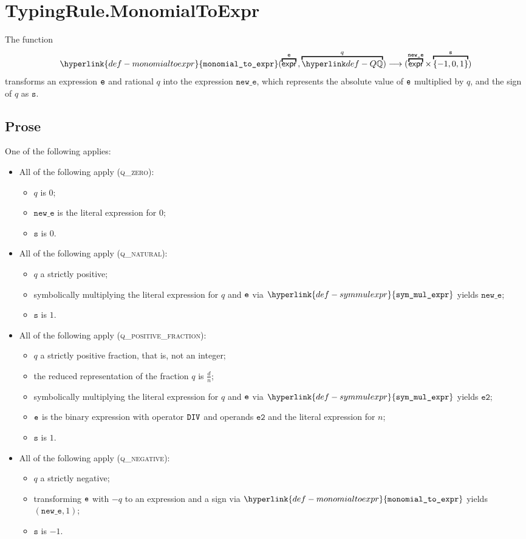 \documentclass{book}
\newcommand\monomialtoexpr[0]{\hyperlink{def-monomialtoexpr}{\texttt{monomial\_to\_expr}}}
\newcommand\symmulexpr[0]{\hyperlink{def-symmulexpr}{\texttt{sym\_mul\_expr}}}
\newcommand\vetwo[0]{\texttt{e2}}
\newcommand\vs[0]{\texttt{s}}
\newcommand\newe[0]{\texttt{new\_e}}
\begin{document}
\section{TypingRule.MonomialToExpr \label{sec:TypingRule.MonomialToExpr}}
\hypertarget{def-monomialtoexpr}{}
The function
\[
\monomialtoexpr(\overname{\expr}{\ve} \aslsep \overname{\Q}{q})
\aslto (\overname{\expr}{\newe} \times \overname{\{-1,0,1\}}{\vs})
\]
transforms an expression $\texttt{e}$ and rational $q$ into the expression $\newe$,
which represents the absolute value of $\texttt{e}$ multiplied by $q$, and the sign of $q$ as $\vs$.

\subsection{Prose}
One of the following applies:
\begin{itemize}
  \item All of the following apply (\textsc{q\_zero}):
  \begin{itemize}
    \item $q$ is $0$;
    \item $\newe$ is the literal expression for $0$;
    \item $\vs$ is $0$.
  \end{itemize}

  \item All of the following apply (\textsc{q\_natural}):
  \begin{itemize}
    \item $q$ a strictly positive;
    \item symbolically multiplying the literal expression for $q$ and $\texttt{e}$ via $\symmulexpr$ yields $\newe$;
    \item $\vs$ is $1$.
  \end{itemize}

  \item All of the following apply (\textsc{q\_positive\_fraction}):
  \begin{itemize}
    \item $q$ a strictly positive fraction, that is, not an integer;
    \item the reduced representation of the fraction $q$ is $\frac{d}{n}$;
    \item symbolically multiplying the literal expression for $q$ and $\texttt{e}$ via $\symmulexpr$ yields $\vetwo$;
    \item $\texttt{e}$ is the binary expression with operator $\texttt{DIV}$ and operands $\vetwo$ and the literal expression for $n$;
    \item $\vs$ is $1$.
  \end{itemize}

  \item All of the following apply (\textsc{q\_negative}):
  \begin{itemize}
    \item $q$ a strictly negative;
    \item transforming $\texttt{e}$ with $-q$ to an expression and a sign via $\monomialtoexpr$ yields $(\newe, 1)$;
    \item $\vs$ is $-1$.
  \end{itemize}
\end{itemize}
\end{document}
